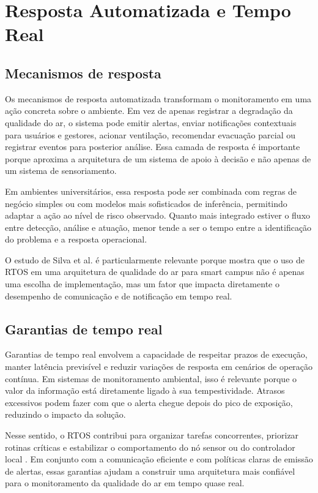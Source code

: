 \documentclass[12pt,a4paper]{article}
\begin{document}
\section{Resposta Automatizada e Tempo Real}
\subsection{Mecanismos de resposta}
Os mecanismos de resposta automatizada transformam o monitoramento em uma ação concreta sobre o ambiente. Em vez de apenas registrar a 
degradação da qualidade do ar, o sistema pode emitir alertas, enviar notificações contextuais para usuários e gestores, acionar ventilação, 
recomendar evacuação parcial ou registrar eventos para posterior análise. Essa camada de resposta é importante porque aproxima a arquitetura 
de um sistema de apoio à decisão e não apenas de um sistema de sensoriamento.

Em ambientes universitários, essa resposta pode ser combinada com regras de negócio simples ou com modelos mais sofisticados de 
inferência, permitindo adaptar a ação ao nível de risco observado. Quanto mais integrado estiver o fluxo entre detecção, análise e 
atuação, menor tende a ser o tempo entre a identificação do problema e a resposta operacional.

O estudo de Silva et al. \cite{silva2025smartcampusrtos} é particularmente relevante porque mostra que o uso de RTOS em uma arquitetura de 
qualidade do ar para smart campus não é apenas uma escolha de implementação, mas um fator que impacta diretamente o desempenho de comunicação e 
de notificação em tempo real.

\subsection{Garantias de tempo real}
Garantias de tempo real envolvem a capacidade de respeitar prazos de execução, manter latência previsível e reduzir variações de resposta 
em cenários de operação contínua. Em sistemas de monitoramento ambiental, isso é relevante porque o valor da informação está diretamente 
ligado à sua tempestividade. Atrasos excessivos podem fazer com que o alerta chegue depois do pico de exposição, reduzindo o impacto da solução.

Nesse sentido, o RTOS contribui para organizar tarefas concorrentes, priorizar rotinas críticas e estabilizar o comportamento do nó sensor ou do 
controlador local \cite{septian2022,wang2023}. Em conjunto com a comunicação eficiente e com políticas claras de emissão de alertas, essas garantias 
ajudam a construir uma arquitetura mais confiável para o monitoramento da qualidade do ar em tempo quase real.
\end{document}
